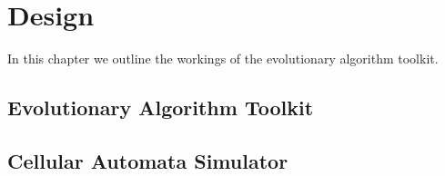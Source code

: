 \chapter{Design}

In this chapter we outline the workings of the evolutionary algorithm toolkit.

\section{Evolutionary Algorithm Toolkit}

\section{Cellular Automata Simulator}